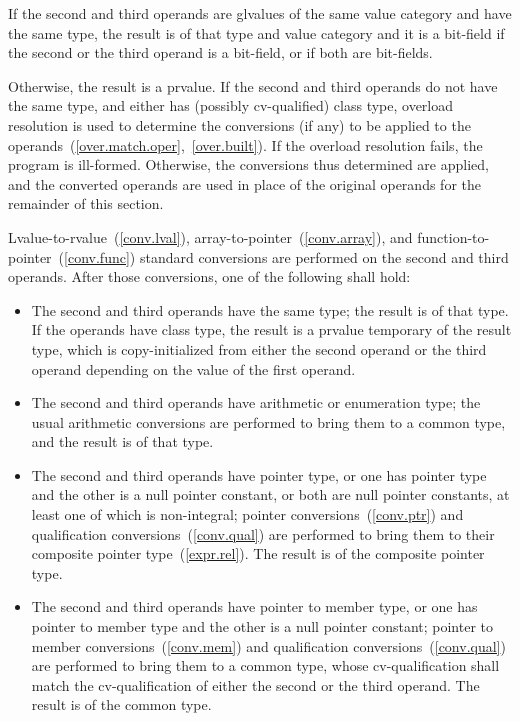 \pnum
If the second and third operands are glvalues of the same value category
and have the same type, the
result is of that type and value category and it is a bit-field if the
second or the third operand is a bit-field, or if both are bit-fields.

\pnum
Otherwise, the result is a prvalue. If the second and third operands do
not have the same type, and either has (possibly cv-qualified) class
type, overload resolution is used to determine the conversions (if any)
to be applied to the operands~(\ref{over.match.oper},~\ref{over.built}).
If the overload resolution fails, the program is ill-formed. Otherwise,
the conversions thus determined are applied, and the converted operands
are used in place of the original operands for the remainder of this
section.

\pnum
Lvalue-to-rvalue~(\ref{conv.lval}), array-to-pointer~(\ref{conv.array}),
and function-to-pointer~(\ref{conv.func}) standard conversions are
performed on the second and third operands. After those conversions, one
of the following shall hold:

\begin{itemize}
\item The second and third operands have the same type; the result is of
that type. If the operands have class type, the result is a prvalue
temporary of the result type, which is copy-initialized from either the
second operand or the third operand depending on the value of the first
operand.

\item The second and third operands have arithmetic or enumeration type;
the usual arithmetic conversions are performed to bring them to a common
type, and the result is of that type.

\item The second and third operands have pointer type, or one has
pointer type and the other is a null pointer constant, or both are
null pointer constants, at least one of which is non-integral; pointer
conversions~(\ref{conv.ptr}) and qualification
conversions~(\ref{conv.qual}) are performed to bring them to their
composite pointer type~(\ref{expr.rel}). The result is of the composite
pointer type.

\item The second and third operands have pointer to member type, or one
has pointer to member type and the other is a null pointer constant;
pointer to member conversions~(\ref{conv.mem}) and qualification
conversions~(\ref{conv.qual}) are performed to bring them to a common
type, whose cv-qualification shall match the cv-qualification of either
the second or the third operand. The result is of the common type.
\end{itemize}

